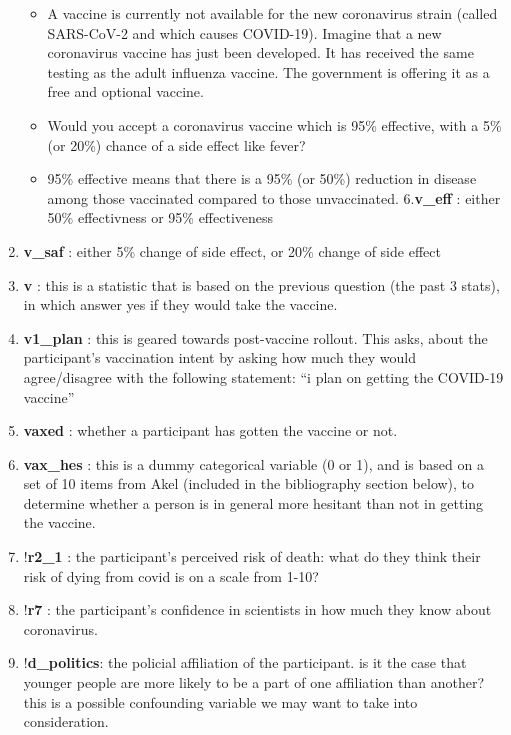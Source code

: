 \documentclass[
]{article}
\providecommand{\tightlist}{%
  \setlength{\itemsep}{0pt}\setlength{\parskip}{0pt}}
\begin{document}
\begin{enumerate}
  \begin{itemize}
  \tightlist
  \item
    A vaccine is currently not available for the new coronavirus strain
    (called SARS-CoV-2 and which causes COVID-19). Imagine that a new
    coronavirus vaccine has just been developed. It has received the
    same testing as the adult influenza vaccine. The government is
    offering it as a free and optional vaccine.
  \item
    Would you accept a coronavirus vaccine which is 95\% effective, with
    a 5\% (or 20\%) chance of a side effect like fever?
  \item
    95\% effective means that there is a 95\% (or 50\%) reduction in
    disease among those vaccinated compared to those unvaccinated.
    6.\textbf{v\_eff} : either 50\% effectivness or 95\% effectiveness
  \end{itemize}
\item
  \textbf{v\_saf} : either 5\% change of side effect, or 20\% change of
  side effect
\item
  \textbf{v} : this is a statistic that is based on the previous
  question (the past 3 stats), in which answer yes if they would take
  the vaccine.
\item
  \textbf{v1\_plan} : this is geared towards post-vaccine rollout. This
  asks, about the participant's vaccination intent by asking how much
  they would agree/disagree with the following statement: ``i plan on
  getting the COVID-19 vaccine''
\item
  \textbf{vaxed} : whether a participant has gotten the vaccine or not.
\item
  \textbf{vax\_hes} : this is a dummy categorical variable (0 or 1), and
  is based on a set of 10 items from Akel (included in the bibliography
  section below), to determine whether a person is in general more
  hesitant than not in getting the vaccine.
\item
  !\textbf{r2\_1} : the participant's perceived risk of death: what do
  they think their risk of dying from covid is on a scale from 1-10?
\item
  !\textbf{r7} : the participant's confidence in scientists in how much
  they know about coronavirus.
\item
  !\textbf{d\_politics}: the policial affiliation of the participant. is
  it the case that younger people are more likely to be a part of one
  affiliation than another? this is a possible confounding variable we
  may want to take into consideration.
\end{enumerate}
\end{document}
